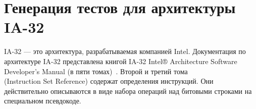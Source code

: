 \section{Генерация тестов для архитектуры IA-32}\label{sec:ia32_application}

IA-32 --- это архитектура, разрабатываемая компанией Intel. Документация по
архитектуре IA-32 представлена книгой IA-32 Intel® Architecture
Software Developer’s Manual (в пяти томах)~\cite{IA32}. Второй и третий тома \\(Instruction Set Reference) содержат определения инструкций. Они действительно описываются в виде набора операций над битовыми строками на специальном псевдокоде. %

%
%
%
%
%
%
%
%
%
%
%
%
%
%


